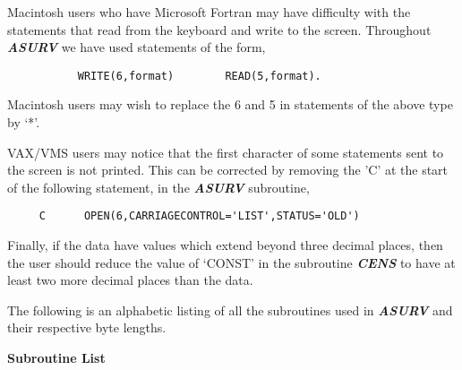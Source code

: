      Macintosh users who have Microsoft Fortran may have difficulty with the
statements that read from the keyboard and write to the screen.  Throughout
{\sl\bf ASURV} we have used statements of the form,
\begin{verbatim}
           WRITE(6,format)        READ(5,format).
\end{verbatim}
Macintosh users may wish to replace the 6 and 5 in statements of the above
type by `*'.
           
     VAX/VMS users may notice that the first character of some statements
sent to the screen is not printed.  This can be corrected by removing the 'C' 
at the start of the following statement, in the {\sl\bf ASURV} subroutine,
\begin{verbatim}
     C      OPEN(6,CARRIAGECONTROL='LIST',STATUS='OLD')
\end{verbatim}

     Finally, if the data have values which extend beyond three decimal places,
then the user should reduce the value of `CONST' in the subroutine 
{\sl\bf CENS} to have at least two more decimal places than the data.


\newpage
{}

     The following is an alphabetic listing of all the subroutines 
used in {\sl\bf ASURV} and their respective byte lengths.


\bigskip
\bigskip
\centerline{\large\bf Subroutine List}

